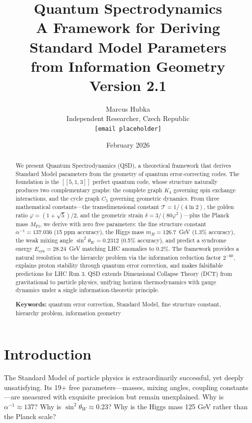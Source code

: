 \documentclass[11pt,a4paper]{article}
\title{\textbf{Quantum Spectrodynamics}\\[0.5em]
\Large A Framework for Deriving Standard Model Parameters\\from Information Geometry\\[1em]
\large Version 2.1}
\author{Marcus Hubka\\
\small Independent Researcher, Czech Republic\\
\small \texttt{[email placeholder]}}
\date{February 2026}
\theoremstyle{definition}
\newcommand{\Tc}{\mathcal{T}}           %
\newcommand{\dgeo}{\delta}              %
\newcommand{\Esyn}{E_{\text{syn}}}      %
\newcommand{\Mpl}{M_{\text{Pl}}}        %
\newcommand{\mH}{m_H}                   %
\begin{document}
\maketitle

\begin{abstract}
\noindent We present Quantum Spectrodynamics (QSD), a theoretical framework that derives Standard Model parameters from the geometry of quantum error-correcting codes. The foundation is the $[[5,1,3]]$ perfect quantum code, whose structure naturally produces two complementary graphs: the complete graph $K_4$ governing spin exchange interactions, and the cycle graph $C_5$ governing geometric dynamics. From three mathematical constants---the transdimensional constant $\Tc = 1/(4\ln 2)$, the golden ratio $\varphi = (1+\sqrt{5})/2$, and the geometric strain $\dgeo = 3/(80\varphi^2)$---plus the Planck mass $\Mpl$, we derive with zero free parameters: the fine structure constant $\alpha^{-1} = 137.036$ (15 ppm accuracy), the Higgs mass $\mH = 126.7$~GeV (1.3\% accuracy), the weak mixing angle $\sin^2\theta_W = 0.2312$ (0.5\% accuracy), and predict a syndrome energy $\Esyn = 28.24$~GeV matching LHC anomalies to 0.2\%. The framework provides a natural resolution to the hierarchy problem via the information reduction factor $2^{-60}$, explains proton stability through quantum error correction, and makes falsifiable predictions for LHC Run 3. QSD extends Dimensional Collapse Theory (DCT) from gravitational to particle physics, unifying horizon thermodynamics with gauge dynamics under a single information-theoretic principle.

\vspace{0.5em}
\noindent\textbf{Keywords:} quantum error correction, Standard Model, fine structure constant, hierarchy problem, information geometry
\end{abstract}

\tableofcontents

\section{Introduction}
\label{sec:introduction}

The Standard Model of particle physics is extraordinarily successful, yet deeply unsatisfying. Its 19+ free parameters---masses, mixing angles, coupling constants---are measured with exquisite precision but remain unexplained. Why is $\alpha^{-1} \approx 137$? Why is $\sin^2\theta_W \approx 0.23$? Why is the Higgs mass 125 GeV rather than the Planck scale?
\end{document}
